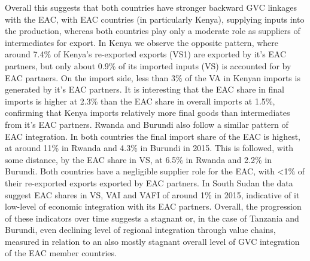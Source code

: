 \documentclass[a4paper]{article}
\begin{document}
Overall this suggests that both countries have stronger backward GVC linkages with the EAC, with EAC countries (in particularly Kenya), supplying inputs into the production, whereas both countries play only a moderate role as suppliers of intermediates for export. In Kenya we observe the opposite pattern, where around 7.4\% of Kenya's re-exported exports (VS1) are exported by it's EAC partners, but only about 0.9\% of its imported inputs (VS) is accounted for by EAC partners. On the import side, less than 3\% of the VA in Kenyan imports is generated by it's EAC partners. It is interesting that the EAC share in final imports is higher at 2.3\% than the EAC share in overall imports at 1.5\%, confirming that Kenya imports relatively more final goods than intermediates from it's EAC partners. Rwanda and Burundi also follow a similar pattern of EAC integration. In both countries the final import share of the EAC is highest, at around 11\% in Rwanda and 4.3\% in Burundi in 2015. This is followed, with some distance, by the EAC share in VS, at 6.5\% in Rwanda and 2.2\% in Burundi. Both countries have a negligible supplier role for the EAC, with <1\% of their re-exported exports exported by EAC partners. In South Sudan the data suggest EAC shares in VS, VAI and VAFI of around 1\% in 2015, indicative of it low-level of economic integration with its EAC partners. Overall, the progression of these indicators over time suggests a stagnant or, in the case of Tanzania and Burundi, even declining level of regional integration through value chains, measured in relation to an also mostly stagnant overall level of GVC integration of the EAC member countries. 




\end{document}
